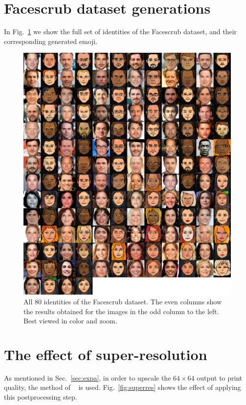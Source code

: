 \documentclass{article} %
\begin{document}



\FloatBarrier

\newpage
\appendix

\section{Facescrub dataset generations}
\label{sec:facescrub}
In Fig.~\ref{fig:allfacescrub} we show the full set of identities of the Facescrub dataset, and their corresponding generated emoji.

\begin{figure}[H]
\centering
\includegraphics[trim=0 0 0 0, clip, width=1\linewidth]{facescrub_full_alt.jpg}
\caption{\label{fig:allfacescrub}All 80 identities of the Facescrub dataset. The even columns show the results obtained for the images in the odd column to the left. Best viewed in color and zoom.}
\end{figure}


\newpage
\section{The effect of super-resolution}
\label{sec:superres}
As mentioned in Sec.~\ref{sec:expa}, in order to upscale the $64 \times 64$ output to print quality, the method of ~\cite{superres} is used. Fig.~\ref{fig:superres} shows the effect of applying this postprocessing step.
\end{document}
